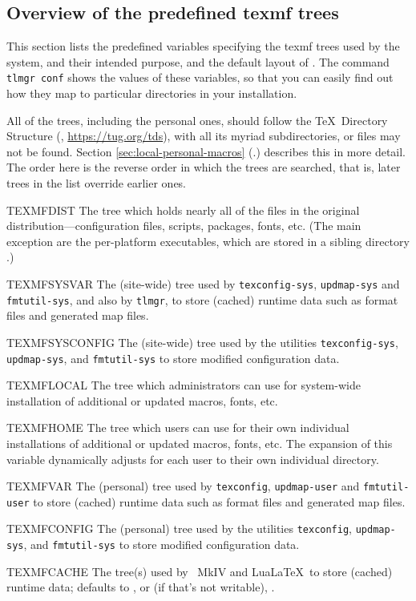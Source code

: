 \documentclass{article}
\begin{document}
\subsection{Overview of the predefined texmf trees}
\label{sec:texmftrees}

This section lists the predefined variables specifying the texmf trees
used by the system, and their intended purpose, and the default layout
of \TL{}. The command \texttt{tlmgr~conf} shows the values of these
variables, so that you can easily find out how they map to particular
directories in your installation.

All of the trees, including the personal ones, should follow the \TeX\
Directory Structure (\TDS, \url{https://tug.org/tds}), with all its
myriad subdirectories, or files may not be found.  Section
\ref{sec:local-personal-macros} (\p.\pageref{sec:local-personal-macros})
describes this in more detail.  The order here is the reverse order in
which the trees are searched, that is, later trees in the list override
earlier ones.

\begin{ttdescription}
\item [TEXMFDIST] The tree which holds nearly all of the files in the original
  distribution---configuration files, scripts, packages, fonts, etc.
  (The main exception are the per-platform executables, which are stored
  in a sibling directory \code{bin/}.)
\item [TEXMFSYSVAR] The (site-wide) tree used by \verb+texconfig-sys+,
  \verb+updmap-sys+ and \verb+fmtutil-sys+, and also by \verb+tlmgr+, to
  store (cached) runtime data such as format files and generated map files.
\item [TEXMFSYSCONFIG] The (site-wide) tree used by the utilities
  \verb+texconfig-sys+, \verb+updmap-sys+, and \verb+fmtutil-sys+ to
  store modified configuration data.
\item [TEXMFLOCAL] The tree which administrators can use for system-wide
  installation of additional or updated macros, fonts, etc.
\item [TEXMFHOME] The tree which users can use for their own individual
  installations of additional or updated macros, fonts, etc.
  The expansion of this variable dynamically adjusts for each user to
  their own individual directory.
\item [TEXMFVAR] The (personal) tree used by \verb+texconfig+,
  \verb+updmap-user+ and \verb+fmtutil-user+ to store (cached) runtime data such
  as format files and generated map files.
\item [TEXMFCONFIG] The (personal) tree used by the utilities
  \verb+texconfig+, \verb+updmap-sys+, and \verb+fmtutil-sys+ to store modified
  configuration data.
\item [TEXMFCACHE] The tree(s) used by \ConTeXt\ MkIV and Lua\LaTeX\
  to store (cached) runtime data; defaults to ,
  or (if that's not writable), \code{TEXMFVAR}.
\end{ttdescription}
\end{document}
